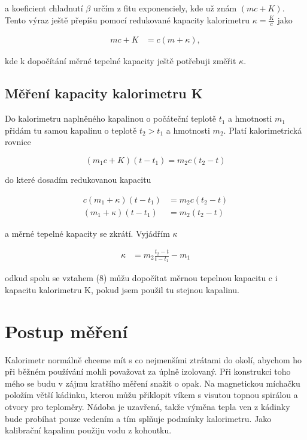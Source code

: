 \documentclass[a4paper,11pt]{article}
\begin{document}
\noindent
a koeficient chladnutí $\beta$ určím z fitu exponenciely, kde už znám $(mc + K)$. Tento výraz ještě přepíšu pomocí redukované kapacity kalorimetru $\kappa = \frac{K}{c}$ jako

\begin{align}
 mc + K &= c(m + \kappa),
\end{align}

\noindent
kde k dopočítání měrné tepelné kapacity ještě potřebuji změřit $\kappa$.


\subsection{Měření kapacity kalorimetru K}

Do kalorimetru naplněného kapalinou o počáteční teplotě $t_1$ a hmotnosti $m_1$ přidám tu samou kapalinu o teplotě $t_2 > t_1$ a hmotnosti $m_2$. Platí kalorimetrická rovnice

\begin{equation}
(m_1c + K)(t-t_1) = m_2c(t_2-t)
\end{equation}

\noindent
do které dosadím redukovanou kapacitu 

\begin{align}
  c(m_1 + \kappa)(t-t_1) &= m_2c(t_2-t) \\
  (m_1 + \kappa)(t-t_1) &= m_2(t_2-t)
\end{align}

\noindent
a měrné tepelné kapacity se zkrátí. Vyjádřím $\kappa$

\begin{align}
  \kappa &= m_2 \frac{t_2 - t}{t - t_1} - m_1
\end{align}

\noindent
odkud spolu se vztahem (8) můžu dopočítat měrnou tepelnou kapacitu c i kapacitu kalorimetru K, pokud jsem použil tu stejnou kapalinu.

\section{Postup měření}

Kalorimetr normálně chceme mít s co nejmenšími ztrátami do okolí, abychom ho při běžném používání mohli považovat za úplně izolovaný. Při konstrukci toho mého se budu v zájmu kratšího měření snažit o opak. Na magnetickou míchačku položím větší kádinku, kterou můžu přiklopit víkem s visutou topnou spirálou a otvory pro teploměry. Nádoba je uzavřená, takže výměna tepla ven z kádinky bude probíhat pouze vedením a tím splňuje podmínky kalorimetru. Jako kalibrační kapalinu použiju vodu z kohoutku.
\end{document}

